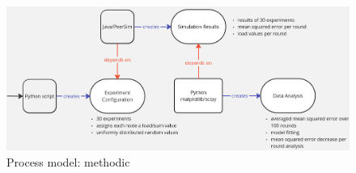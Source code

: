 \begin{figure}
    \centering
    \includegraphics[width=\textwidth]{figures/Diagrams/process_model.png}
    \caption{Process model: methodic}
    \label{fig:ProcessModel}
\end{figure}